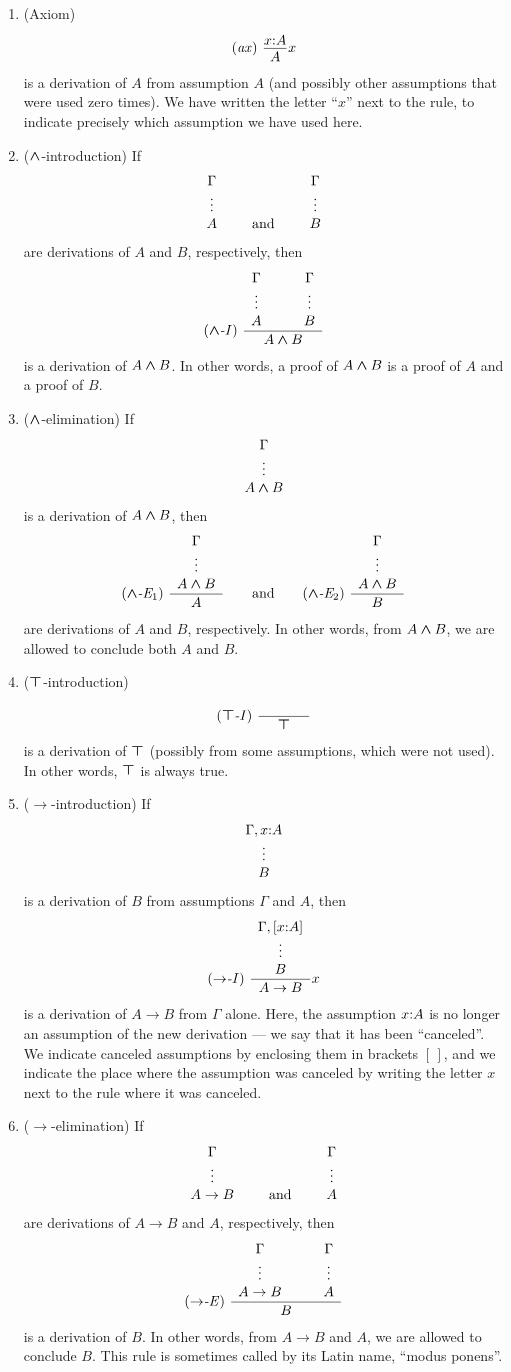 \documentclass{article}
\begin{document}
\begin{enumerate}
\item (Axiom) 
\[ \trule{ax}\ \deriv{\typ{x}{A}}{A} x
\]
is a derivation of $A$ from assumption $A$ (and possibly other
assumptions that were used zero times). We have written the letter
``$x$'' next to the rule, to indicate precisely which assumption we
have used here.
\item ($\mathbin{\textrm{\rm\boldmath $\wedge$}}$-introduction)
If 
\[ \mbox{$\begin{array}[b]{c}\Gamma\\\vdots\\A\end{array}$} \hspace{2em}\mbox{and}\hspace{2em}
   \mbox{$\begin{array}[b]{c}\Gamma\\\vdots\\B\end{array}$}
\]
are derivations of $A$ and $B$, respectively, then
\[
\trule{$\cand$-I}\ \deriv{\ideriv{\Gamma}{A}\sep\ideriv{\Gamma}{B}}{A\cand
  B}
\]
is a derivation of $A\mathbin{\textrm{\rm\boldmath $\wedge$}} B$. In other words, a proof of $A\mathbin{\textrm{\rm\boldmath $\wedge$}} B$
is a proof of $A$ and a proof of $B$.
\item ($\mathbin{\textrm{\rm\boldmath $\wedge$}}$-elimination)
If 
\[ \mbox{$\begin{array}[b]{c}\Gamma\\\vdots\\A\mathbin{\textrm{\rm\boldmath $\wedge$}} B\end{array}$}
\]
is a derivation of $A\mathbin{\textrm{\rm\boldmath $\wedge$}} B$, then
\[
\trule{$\cand$-E$_1$}\ \deriv{\ideriv{\Gamma}{A\cand
    B}}{A} 
\sep\mbox{and}\sep
\trule{$\cand$-E$_2$}\ \deriv{\ideriv{\Gamma}{A\cand
    B}}{B} 
\]
are derivations of $A$ and $B$, respectively. In other words, from
$A\mathbin{\textrm{\rm\boldmath $\wedge$}} B$, we are allowed to conclude both $A$ and $B$. 
\item ($\textrm{\rm\boldmath $\top$}$-introduction)
\[ \trule{$\ctrue$-I}\ \deriv{\hspace{.5in}}{\ctrue}
\]
is a derivation of $\textrm{\rm\boldmath $\top$}$ (possibly from some assumptions, which
were not used). In other words, $\textrm{\rm\boldmath $\top$}$ is always true.
\item ($\to$-introduction)
If
\[ \mbox{$\begin{array}[b]{c}\Gamma,x{:}A\\\vdots\\B\end{array}$}
\]
is a derivation of $B$ from assumptions $\Gamma$ and $A$, then 
\[ \trule{$\to$-I}\ \deriv{\ideriv{\Gamma,[\typ{x}{A}]}{B}}{A\to B} x
\]
is a derivation of $A\to B$ from $\Gamma$ alone. Here, the assumption
$x{:}A$ is no longer an assumption of the new derivation --- we
say that it has been ``canceled''. We indicate canceled assumptions
by enclosing them in brackets $[\,]$, and we indicate the place where
the assumption was canceled by writing the letter $x$ next to the rule
where it was canceled.
\item ($\to$-elimination)
If 
\[  \mbox{$\begin{array}[b]{c}\Gamma\\\vdots\\A\to B\end{array}$} \hspace{2em}\mbox{and}\hspace{2em}
   \mbox{$\begin{array}[b]{c}\Gamma\\\vdots\\A\end{array}$}
\]
are derivations of $A\to B$ and $A$, respectively, then
\[ \trule{$\to$-E}\ \deriv{\ideriv{\Gamma}{A\to B} \sep
  \ideriv{\Gamma}{A}}{B}
\]
is a derivation of $B$. In other words, from $A\to B$ and $A$, we are
allowed to conclude $B$. This rule is sometimes called by its Latin
name, ``modus ponens''.
\suspendenumerate
\end{enumerate}
\end{document}
